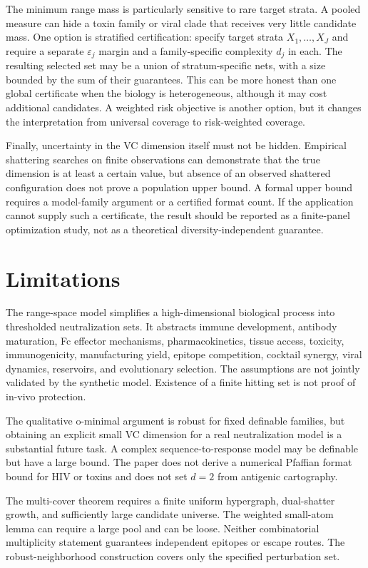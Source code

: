 \documentclass[11pt,a4paper]{article}
\newcommand{\eps}{\varepsilon}
\begin{document}
The minimum range mass is particularly sensitive to rare target strata. A pooled measure can hide a toxin family or viral clade that receives very little candidate mass. One option is stratified certification: specify target strata $X_1,\ldots,X_J$ and require a separate $\eps_j$ margin and a family-specific complexity $d_j$ in each. The resulting selected set may be a union of stratum-specific nets, with a size bounded by the sum of their guarantees. This can be more honest than one global certificate when the biology is heterogeneous, although it may cost additional candidates. A weighted risk objective is another option, but it changes the interpretation from universal coverage to risk-weighted coverage.

Finally, uncertainty in the VC dimension itself must not be hidden. Empirical shattering searches on finite observations can demonstrate that the true dimension is at least a certain value, but absence of an observed shattered configuration does not prove a population upper bound. A formal upper bound requires a model-family argument or a certified format count. If the application cannot supply such a certificate, the result should be reported as a finite-panel optimization study, not as a theoretical diversity-independent guarantee.

\section{Limitations}
The range-space model simplifies a high-dimensional biological process into thresholded neutralization sets. It abstracts immune development, antibody maturation, Fc effector mechanisms, pharmacokinetics, tissue access, toxicity, immunogenicity, manufacturing yield, epitope competition, cocktail synergy, viral dynamics, reservoirs, and evolutionary selection. The assumptions are not jointly validated by the synthetic model. Existence of a finite hitting set is not proof of in-vivo protection.

The qualitative o-minimal argument is robust for fixed definable families, but obtaining an explicit small VC dimension for a real neutralization model is a substantial future task. A complex sequence-to-response model may be definable but have a large bound. The paper does not derive a numerical Pfaffian format bound for HIV or toxins and does not set $d=2$ from antigenic cartography.

The multi-cover theorem requires a finite uniform hypergraph, dual-shatter growth, and sufficiently large candidate universe. The weighted small-atom lemma can require a large pool and can be loose. Neither combinatorial multiplicity statement guarantees independent epitopes or escape routes. The robust-neighborhood construction covers only the specified perturbation set.
\end{document}
